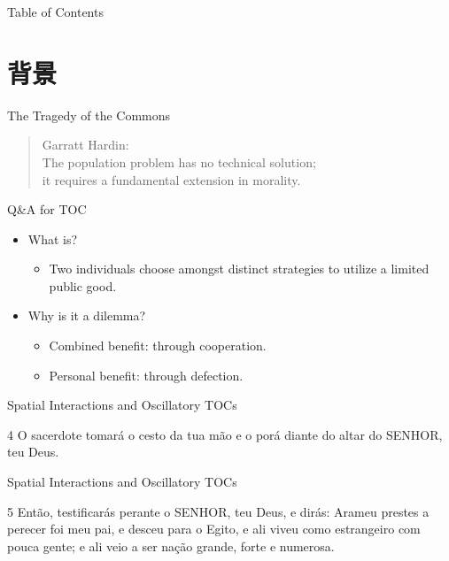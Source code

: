 \documentclass[14pt,aspectratio=169]{beamer}
\author{修格致}
\title{\TT}
\institute{IRSGIS\\Peking U}
\date{\today}
\newcommand{\TT}{Spatial Interactions and Oscillatory TOCs}
\begin{document}
\begin{frame}
\titlepage
\end{frame}

\begin{frame}{Table of Contents}
    \tableofcontents
\end{frame}

\LARGE
\section{背景}
\begin{frame}{The Tragedy of the Commons}
\begin{quote}{Garratt Hardin:}
 \small
 \\
    The population problem has no technical solution;\\
it requires a fundamental extension in morality.
\end{quote}

\end{frame}

\begin{frame}{Q\&A for TOC}
\begin{itemize}
    \item What is?
    \begin{itemize}
        \item Two individuals choose amongst distinct strategies to utilize a limited public good.
    \end{itemize}
    \item Why is it a dilemma?
    \begin{itemize}
        \item Combined benefit: through cooperation.
        \item Personal benefit: through defection.
    \end{itemize}
\end{itemize}
\end{frame}

\begin{frame}{\TB}{\TT}
 \begin{block}{\DT}
4 O sacerdote tomará o cesto da tua mão e o porá diante do altar do SENHOR, teu Deus.
 \end{block}
\end{frame}

\begin{frame}{\TB}{\TT}
 \begin{block}{\DT}
 \Large
5 Então, testificarás perante o SENHOR, teu Deus, e dirás: Arameu prestes a perecer foi meu pai, e desceu para o Egito, e ali viveu como estrangeiro com pouca gente; e ali veio a ser nação grande, forte e numerosa.
 \end{block}
\end{frame}
\end{document}
